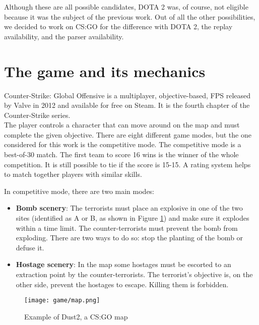 	\noindent Although these are all possible candidates, DOTA 2 was, of course, not eligible because it was the subject of the previous work. 
	Out of all the other possibilities, we decided to work on CS:GO for the difference with DOTA 2, the replay availability, and the parser availability.  

	
\section{\label{sec:csgo}The game and its mechanics}

	Counter-Strike: Global Offensive is a multiplayer, objective-based, \gls{FPS} released by Valve in 2012 and available for free on \gls{Steam}. 
	It is the fourth chapter of the Counter-Strike series.\\
	The player controls a character that can move around on the map and must complete the given objective. 
	There are eight different game modes, but the one considered for this work is the competitive mode. 
	The competitive mode is a best-of-30 match. 
	The first team to score 16 wins is the winner of the whole competition. 
	It is still possible to tie if the score is 15-15. 
	A rating system helps to match together players with similar skills. 
	
	In competitive mode, there are two main modes: 
	
	\begin{itemize}
	
		\item \textbf{Bomb scenery}: The terrorists must place an explosive in one of the two sites (identified as A or B, as shown in Figure \ref{fig:map}) and make sure it explodes within a time limit. 
		The counter-terrorists must prevent the bomb from exploding. There are two ways to do so: stop the planting of the bomb or defuse it.
		
		\item \textbf{Hostage scenery}: In the map some hostages must be escorted to an extraction point by the counter-terrorists. The terrorist's objective is, on the other side, prevent the hostages to escape. 
		Killing them is forbidden.
	
	\end{itemize}
	
	\begin{figure}[!h] 
		\centering 
		\texttt{[image: game/map.png]}
		\caption{\label{fig:map}Example of Dust2, a CS:GO map}
	\end{figure}
	

